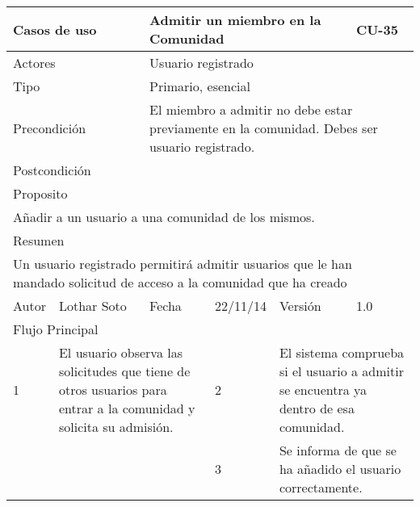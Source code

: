 \documentclass{article}
\begin{document}









\begin{table}[h]
\begin{tabular}{|l|l|l|l|l|l|}
\hline
\multicolumn{2}{|p{2cm}|}{Casos de uso}  & \multicolumn{3}{p{7cm}|}{Admitir un miembro en la Comunidad} & CU-35 \\
\hline
\multicolumn{2}{|p{2cm}|}{Actores}       & \multicolumn{4}{p{8cm}|}{Usuario registrado}        \\
\hline
\multicolumn{2}{|p{2cm}|}{Tipo}          & \multicolumn{4}{p{8cm}|}{Primario, esencial}        \\
\hline
\multicolumn{2}{|p{2cm}|}{Precondición}  & \multicolumn{4}{p{8cm}|}{El miembro a admitir no debe estar previamente en la comunidad. Debes ser usuario registrado.}        \\
\hline
\multicolumn{2}{|p{2cm}|}{Postcondición} & \multicolumn{4}{p{8cm}|}{}        \\
\hline
\multicolumn{6}{|p{10cm}|}{Proposito}                                   \\
\hline
\multicolumn{6}{|p{10cm}|}{Añadir a un usuario a una comunidad de los mismos.}                                            \\
\hline
\multicolumn{6}{|p{10cm}|}{Resumen}                                 \\
\hline
\multicolumn{6}{|p{10cm}|}{Un usuario registrado permitirá admitir usuarios que le han mandado solicitud de acceso a la comunidad que ha creado}                                            \\
\hline
Autor         &       Lothar Soto        &  Fecha   &  22/11/14   &   Versión  & 1.0\\     
\hline
\multicolumn{6}{|p{10cm}|}{Flujo Principal}\\
\hline
\multicolumn{1}{|p{0.5cm}|}{1} & \multicolumn{2}{p{3cm}}{El usuario observa las solicitudes que tiene de otros usuarios para entrar a la comunidad y solicita su admisión.} & \multicolumn{1}{|p{0.5cm}|}{2} & \multicolumn{2}{p{3cm}|}{El sistema comprueba si el usuario a admitir se encuentra ya dentro de esa comunidad.}\\
\hline
\multicolumn{1}{|p{0.5cm}|}{} & \multicolumn{2}{p{3cm}}{} & \multicolumn{1}{|p{0.5cm}|}{3} & \multicolumn{2}{p{3cm}|}{Se informa de que se ha añadido el usuario correctamente.}\\
\hline


\end{tabular}
\end{table}
\end{document}
